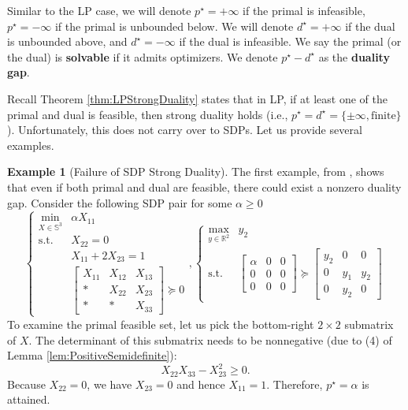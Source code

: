 \documentclass[
]{book}
\theoremstyle{definition}
\theoremstyle{definition}
\newtheorem{example}{Example}[chapter]
\theoremstyle{definition}
\theoremstyle{definition}
\theoremstyle{remark}
\begin{document}
Similar to the LP case, we will denote \(p^\star = +\infty\) if the primal is infeasible, \(p^\star = - \infty\) if the primal is unbounded below. We will denote \(d^\star = +\infty\) if the dual is unbounded above, and \(d^\star = -\infty\) if the dual is infeasible. We say the primal (or the dual) is \textbf{solvable} if it admits optimizers. We denote \(p^\star - d^\star\) as the \textbf{duality gap}.

Recall Theorem \ref{thm:LPStrongDuality} states that in LP, if at least one of the primal and dual is feasible, then strong duality holds (i.e., \(p^\star = d^\star = \{\pm \infty, \text{finite} \}\)). Unfortunately, this does not carry over to SDPs. Let us provide several examples.

\begin{example}[Failure of SDP Strong Duality]
\protect\hypertarget{exm:FailureSDPDuality}{}\label{exm:FailureSDPDuality}The first example, from \citep{ramana97mp-exact}, shows that even if both primal and dual are feasible, there could exist a nonzero duality gap. Consider the following SDP pair for some \(\alpha \geq 0\)
\[
\begin{cases}
\min_{X \in \mathbb{S}^{3}} & \alpha X_{11} \\
\mathrm{s.t.}& X_{22} = 0 \\
& X_{11} + 2 X_{23} = 1 \\
& \begin{bmatrix} X_{11} & X_{12} & X_{13} \\
* & X_{22} & X_{23} \\
* & * & X_{33} \end{bmatrix} \succeq 0 
\end{cases}, 
\begin{cases}
\max_{y \in \mathbb{R}^{2}} & y_2 \\
\mathrm{s.t.}& \begin{bmatrix} \alpha & 0 & 0 \\ 0 & 0 & 0 \\ 0 & 0 & 0 \end{bmatrix} \succeq \begin{bmatrix} y_2 & 0 & 0 \\ 0 & y_1 & y_2 \\ 0 & y_2 & 0 \end{bmatrix}
\end{cases}
\]
To examine the primal feasible set, let us pick the bottom-right \(2\times 2\) submatrix of \(X\). The determinant of this submatrix needs to be nonnegative (due to (4) of Lemma \ref{lem:PositiveSemidefinite}):
\[
X_{22} X_{33} - X_{23}^2 \geq 0.
\]
Because \(X_{22} = 0\), we have \(X_{23} = 0\) and hence \(X_{11} = 1\). Therefore, \(p^\star = \alpha\) is attained.


\end{example}
\end{document}
